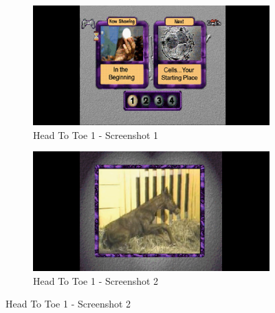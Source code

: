 \begin{figure}[H]
    \centering
    \begin{subfigure}{0.45\textwidth}
        \centering
        \includegraphics[width=\linewidth]{Games/HeadtoToe/Images/HeadToToe1Image1.png}
        \caption{Head To Toe 1 - Screenshot 1}
    \end{subfigure}
    \begin{subfigure}{0.45\textwidth}
        \includegraphics[width=\linewidth]{Games/HeadtoToe/Images/HeadToToe1Image2.png}
        \caption{Head To Toe 1 - Screenshot 2}
    \end{subfigure}


\end{figure}
